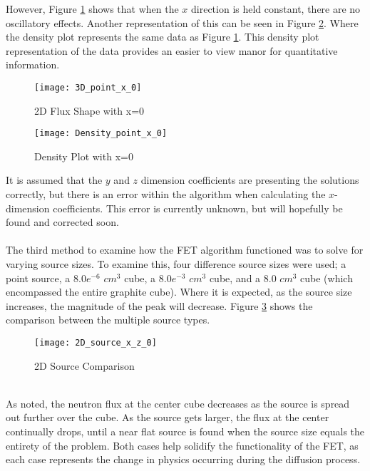 \documentclass[10tma4paper]{article}
\begin{document}
\noindent However, Figure \ref{3Dcoefficients} shows that when the $x$ direction is held constant, there are no oscillatory effects. Another representation of this can be seen in Figure \ref{2Ddensity}.  Where the density plot represents the same data as Figure \ref{3Dcoefficients}. This density plot representation of the data provides an easier to view manor for quantitative information.
\begin{figure}[H]
	\caption{2D Flux Shape with x=0}
	\begin{center}
		\texttt{[image: 3D\_point\_x\_0]}
	\end{center}
	\label{3Dcoefficients}
\end{figure}
\begin{figure}[H]
	\caption{Density Plot with x=0}
	\begin{center}
		\texttt{[image: Density\_point\_x\_0]}
	\end{center}
	\label{2Ddensity}
\end{figure}
\noindent It is assumed that the $y$ and $z$ dimension coefficients are presenting the solutions correctly, but there is an error within the algorithm when calculating the $x$-dimension coefficients. This error is currently unknown, but will hopefully be found and corrected soon.
\\
\\
The third method to examine how the FET algorithm functioned was to solve for varying source sizes. To examine this, four difference source sizes were used; a point source, a $8.0e^{-6}$ $cm^{3}$ cube, a $8.0e^{-3}$ $cm^{3}$ cube, and a $8.0$ $cm^{3}$ cube (which encompassed the entire graphite cube). Where it is expected, as the source size increases, the magnitude of the peak will decrease. Figure \ref{2Dsourcecomparison} shows the comparison between the multiple source types.
\begin{figure}[!htbp]
	\caption{2D Source Comparison}
	\begin{center}
		\texttt{[image: 2D\_source\_x\_z\_0]}
	\end{center}
	\label{2Dsourcecomparison}
\end{figure}
\\
As noted, the neutron flux at the center cube decreases as the source is spread out further over the cube.  As the source gets larger, the flux at the center continually drops, until a near flat source is found when the source size equals the entirety of the problem. Both cases help solidify the functionality of the FET, as each case represents the change in physics occurring during the diffusion process.
\end{document}
